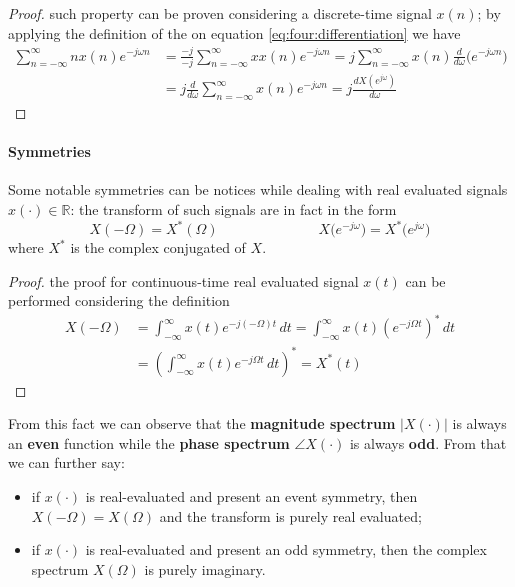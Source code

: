 		\begin{proof}
			such property can be proven considering a discrete-time signal $x(n)$; by applying the definition of the \dtft on equation \ref{eq:four:differentiation} we have
			\begin{align*}
				\sum_{n=-\infty}^\infty n x(n) e^{-j\omega n} & = \frac{-j}{-j}\sum_{n=-\infty}^\infty x x(n) e^{-j\omega n}  = j \sum_{n=-\infty}^\infty x(n) \frac{d}{d\omega} \Big(e^{-j\omega n}\Big) \\
				& = j \frac{d}{d\omega}\sum_{n=-\infty}^\infty x(n) e^{-j\omega n} = j \frac{dX(e^{j\omega})}{d\omega}
			\end{align*}
		\end{proof}
		
		\paragraph{Symmetries} Some notable symmetries can be notices while dealing with real evaluated signals $x(\cdot)\in \mathds R$: the transform of such signals are in fact in the form
		\begin{equation}
			X(-\Omega) = X^*(\Omega) \hspace{3cm} X\big(e^{-j\omega}\big) = X^*\big(e^{j\omega}\big)
		\end{equation}
		where $X^*$ is the complex conjugated of $X$.
		\begin{proof} 
			the proof for continuous-time real evaluated signal $x(t)$ can be performed considering the definition
			\begin{align*}
				X(-\Omega) & = \int_{-\infty}^\infty x(t) e^{-j (-\Omega) t} \, dt = \int_{-\infty}^\infty x(t) \left(e^{-j\Omega t}\right)^* \, dt \\ 
				& = \left( \int_{-\infty}^\infty x(t) e^{-j\Omega t} \, dt\right)^* = X^*(t)
			\end{align*}
		\end{proof} \noindent
		
		From this fact we can observe that the \textbf{magnitude spectrum} $|X(\cdot)|$ is always an \textbf{even} function while the \textbf{phase spectrum} $\angle X(\cdot)$ is always \textbf{odd}. From that we can further say:
		\begin{itemize}
			\item if $x(\cdot)$ is real-evaluated and present an event symmetry, then $X(-\Omega) = X(\Omega)$ and the transform is purely real evaluated;
			
			\item if $x(\cdot)$ is real-evaluated and present an odd symmetry, then the complex spectrum $X(\Omega)$ is purely imaginary.
		\end{itemize}
		
